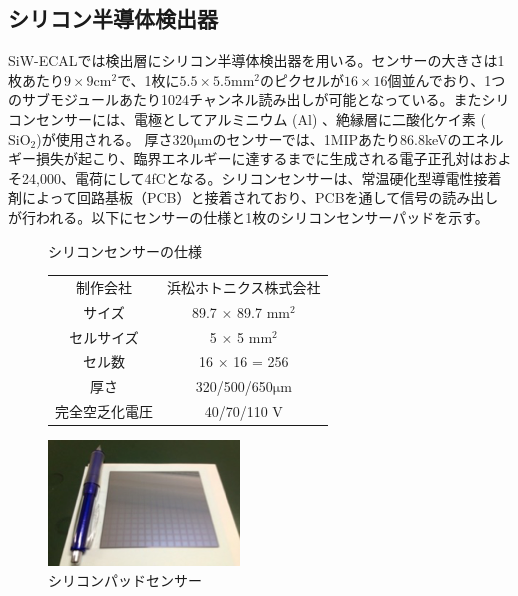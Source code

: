 \subsection{シリコン半導体検出器}
SiW-ECALでは検出層にシリコン半導体検出器を用いる。センサーの大きさは1枚あたり$9 \times 9 \mathrm{{cm}^2}$で、1枚に$5.5 \times 5.5 {\mathrm{mm}^2}$のピクセルが$16 \times 16$個並んでおり、1つのサブモジュールあたり1024チャンネル読み出しが可能となっている。またシリコンセンサーには、電極としてアルミニウム ($\mathrm{Al}$) 、絶縁層に二酸化ケイ素 ($\mathrm{SiO_2}$)が使用される。 厚さ320$\mathrm{\mu m}$のセンサーでは、1MIPあたり86.8keVのエネルギー損失が起こり、臨界エネルギーに達するまでに生成される電子正孔対はおよそ24,000、電荷にして4fCとなる。シリコンセンサーは、常温硬化型導電性接着剤によって回路基板（PCB）と接着されており、PCBを通して信号の読み出しが行われる。以下にセンサーの仕様と1枚のシリコンセンサーパッドを示す。
\begin{figure}[H]
 \begin{minipage}[h]{.45\linewidth}
   \centering
   \caption{シリコンセンサーの仕様}
   \begin{tabular}{|c|c|}
         \hline
   	制作会社 & 浜松ホトニクス株式会社\\
	サイズ & 89.7 $\times$ 89.7 $\mathrm{{mm}^2}$ \\
	セルサイズ & 5 $\times$ 5 $\mathrm{{mm}^2}$\\
	セル数 & 16 $\times$ 16 = 256\\
	厚さ & 320/500/650$\mathrm{\mu m}$\\
	完全空乏化電圧 & 40/70/110 V\\
        \hline
  \end{tabular}
\end{minipage}
\hfill
\begin{minipage}[h]{.45\linewidth}
	\begin{center}
 \includegraphics[keepaspectratio, scale=0.8]
 	{Figure/Siwecal/si_sensor.png}
 		\caption{シリコンパッドセンサー}
 		\label{sensor}
	\end{center}
\end{minipage}
\end{figure}
